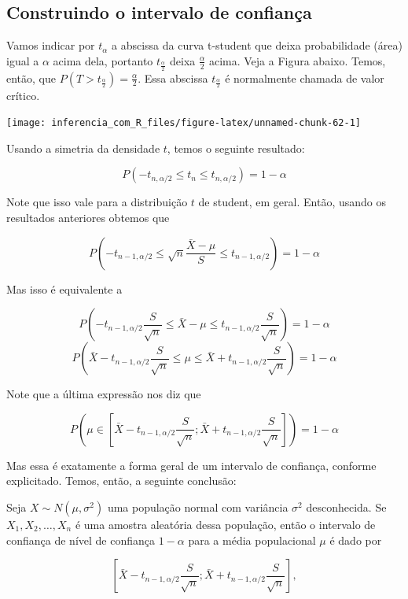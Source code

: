 \documentclass[
]{book}
\begin{document}
\hypertarget{construindo-o-intervalo-de-confianuxe7a-1}{%
\subsection{Construindo o intervalo de confiança}\label{construindo-o-intervalo-de-confianuxe7a-1}}

Vamos indicar por \(t_\alpha\) a abscissa da curva t-student que deixa probabilidade (área) igual a \(\alpha\) acima dela, portanto \(t_\frac{\alpha}{2}\) deixa \(\frac{\alpha}{2}\) acima. Veja a Figura abaixo. Temos, então, que \(P(T > t_\frac{\alpha}{2})= \frac{\alpha}{2}\). Essa abscissa \(t_\frac{\alpha}{2}\) é normalmente chamada de valor crítico.

\begin{center}\texttt{[image: inferencia\_com\_R\_files/figure-latex/unnamed-chunk-62-1]} \end{center}

Usando a simetria da densidade \(t\), temos o seguinte resultado:

\[P\left(-t_{n,\alpha/2}\leq t_{n} \leq t_{n,\alpha/2}\right)=1-\alpha\]

Note que isso vale para a distribuição \(t\) de student, em geral. Então, usando os resultados anteriores obtemos que

\[P\left(-t_{n-1,\alpha/2}\leq \sqrt{n}\frac{\bar X-\mu}{S} \leq t_{n-1,\alpha/2}\right)=1-\alpha\]

Mas isso é equivalente a

\[P\left(-t_{n-1,\alpha/2}\frac{S}{\sqrt{n}}\leq \bar X-\mu \leq t_{n-1,\alpha/2}\frac{S}{\sqrt{n}}\right)=1-\alpha\]
\[P\left(\bar X-t_{n-1,\alpha/2}\frac{S}{\sqrt{n}}\leq \mu \leq \bar X + t_{n-1,\alpha/2}\frac{S}{\sqrt{n}}\right)=1-\alpha\]

Note que a última expressão nos diz que

\[P\left(\mu \in \left[\bar X-t_{n-1,\alpha/2}\frac{S}{\sqrt{n}};\bar X+t_{n-1,\alpha/2}\frac{S}{\sqrt{n}}\right]\right)=1-\alpha\]

Mas essa é exatamente a forma geral de um intervalo de confiança, conforme explicitado. Temos, então, a seguinte conclusão:

Seja \(X\sim N(\mu, \sigma^2)\) uma população normal com variância \(\sigma^2\) desconhecida. Se \(X_1, X_2,\ldots , X_n\) é uma amostra aleatória dessa população, então o intervalo de confiança de nível de confiança \(1-\alpha\) para a média populacional \(\mu\) é dado por

\[\left[\bar X-t_{n-1,\alpha/2}\frac{S}{\sqrt{n}};\bar X+t_{n-1,\alpha/2}\frac{S}{\sqrt{n}}\right],\]
\end{document}
